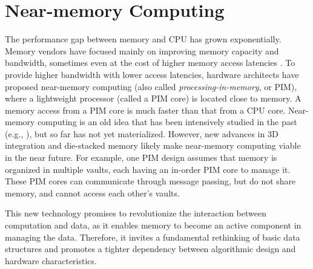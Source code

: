 \section{Near-memory Computing}

The performance gap between memory and CPU has grown exponentially.
Memory vendors have focused mainly on improving memory capacity and
bandwidth, sometimes even at the cost of higher memory access
latencies \cite{Chang:2016, DBLP:conf/hpca/LeeKSLSM13,
  DBLP:conf/hpca/LeeKPKSCM15, Chang:2017, Lee:2017, Mutlu:2013,
  superfri, kevinchang-thesis, donghyuklee-thesis}.  To provide higher
bandwidth with lower access latencies, hardware architects have
proposed near-memory computing (also called
\textit{processing-in-memory}, or PIM), where a lightweight processor
(called a PIM core) is located close to memory. A memory access from a
PIM core is much faster than that from a CPU core.  Near-memory
computing is an old idea that has been intensively studied in the past
(e.g., \cite{Stone1970, Kogge1994, Gokhale1995, Patterson1997,
  Oskin1998, KangHYKGLTP99, Hall1999, Elliott:1992}), but so far has
not yet materialized. However, new advances in 3D integration and
die-stacked memory likely make near-memory computing viable in the
near future.  For example, one PIM design \cite{Ahn2015:2,
  Zhang2014:TTP, Ahn2015:1, boroumand2016} assumes that memory is
organized in multiple vaults, each having an in-order PIM core to
manage it.  These PIM cores can communicate through message passing,
but do not share memory, and cannot access each other's vaults.

This new technology promises to revolutionize the interaction between
computation and data, as it enables memory to become an active
component in managing the data.  Therefore, it invites a fundamental
rethinking of basic data structures and promotes a tighter dependency
between algorithmic design and hardware characteristics.

